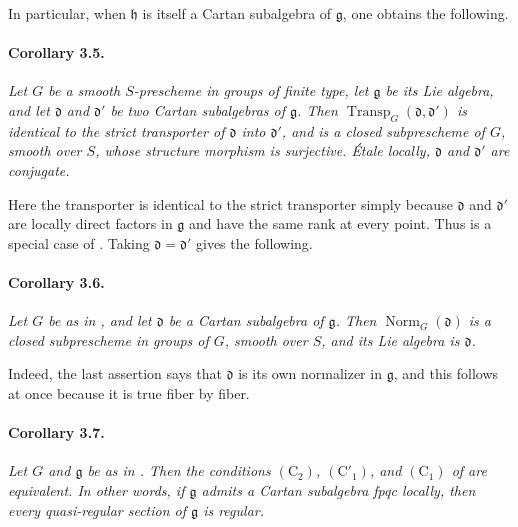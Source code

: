 In particular, when \(\mathfrak h\) is itself a Cartan subalgebra
of \(\mathfrak g\), one obtains the following.

\paragraph{\textbf{Corollary 3.5.}}
{\itshape Let \(G\) be a smooth \(S\)-prescheme in groups of finite
type, let \(\mathfrak g\) be its Lie algebra, and let
\(\mathfrak d\) and \(\mathfrak d'\) be two Cartan subalgebras of
\(\mathfrak g\). Then
\(\operatorname{Transp}_G(\mathfrak d,\mathfrak d')\) is identical
to the strict transporter of \(\mathfrak d\) into
\(\mathfrak d'\), and is a closed subprescheme of \(G\), smooth
over \(S\), whose structure morphism is surjective. Étale locally,
\(\mathfrak d\) and \(\mathfrak d'\) are conjugate.}

Here the transporter is identical to the strict transporter simply
because \(\mathfrak d\) and \(\mathfrak d'\) are locally direct
factors in \(\mathfrak g\) and have the same rank at every point.
Thus  is a special case of . Taking
\(\mathfrak d=\mathfrak d'\) gives the following.

\paragraph{\textbf{Corollary 3.6.}}
{\itshape Let \(G\) be as in , and let \(\mathfrak d\) be a
Cartan subalgebra of \(\mathfrak g\). Then
\(\operatorname{Norm}_G(\mathfrak d)\) is a closed subprescheme in
groups of \(G\), smooth over \(S\), and its Lie algebra is
\(\mathfrak d\).}

Indeed, the last assertion says that \(\mathfrak d\) is its own
normalizer in \(\mathfrak g\), and this follows at once because it
is true fiber by fiber.

\paragraph{\textbf{Corollary 3.7.}}
{\itshape Let \(G\) and \(\mathfrak g\) be as in . Then the
conditions \((\mathrm C_2)\), \((\mathrm C'_1)\), and
\((\mathrm C_1)\) of  are equivalent. In other words, if
\(\mathfrak g\) admits a Cartan subalgebra fpqc locally, then every
quasi-regular section of \(\mathfrak g\) is regular.}

